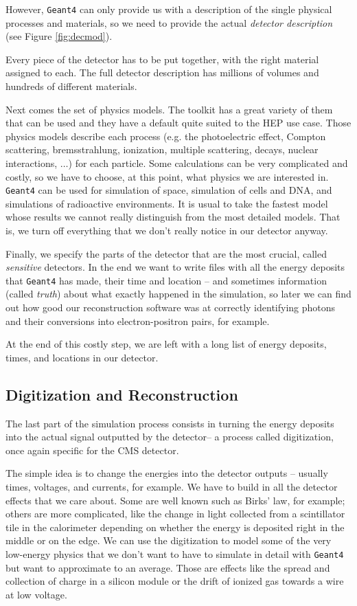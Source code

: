 However, \texttt{Geant4} can only provide us with a description of the single physical processes and materials, so we need to provide the actual \emph{detector description} (see Figure \ref{fig:decmod}). 

Every piece of the detector has to be put together, with the right material assigned to each. The full detector description has millions of volumes and hundreds of different materials.

Next comes the set of physics models. The toolkit has a great variety of them that can be used and they have a default quite suited to the HEP use case. Those physics models describe each process (e.g. the photoelectric effect, Compton scattering, bremsstrahlung, ionization, multiple scattering, decays, nuclear interactions, $\dots$) for each particle. Some calculations can be very complicated and costly, so we have to choose, at this point, what physics we are interested in. \texttt{Geant4} can be used for simulation of space, simulation of cells and DNA, and simulations of radioactive environments. It is usual to take the fastest model whose results we cannot really distinguish from the most detailed models. That is, we turn off everything that we don’t really notice in our detector anyway.

Finally, we specify the parts of the detector that are the most crucial, called \emph{sensitive} detectors. In the end we want to write files with all the energy deposits that  \texttt{Geant4} has made, their time and location – and sometimes information (called \emph{truth}) about what exactly happened in the simulation, so later we can find out how good our reconstruction software was at correctly identifying photons and their conversions into electron-positron pairs, for example.

At the end of this costly step, we are left with a long list of energy deposits, times, and locations in our detector. 

\subsection{Digitization and Reconstruction} 

The last part of the simulation process consists in turning the energy deposits into the actual signal outputted by the detector-- a process called digitization, once again specific for the CMS detector.

The simple idea is to change the energies into the detector outputs – usually times, voltages, and currents, for example. We have to build in all the detector effects that we care about. Some are well known such as Birks’ law, for example; others are more complicated, like the change in light collected from a scintillator tile in the calorimeter depending on whether the energy is deposited right in the middle or on the edge. We can use the digitization to model some of the very low-energy physics that we don’t want to have to simulate in detail with \texttt{Geant4} but want to approximate to an average. Those are effects like the spread and collection of charge in a silicon module or the drift of ionized gas towards a wire at low voltage.

